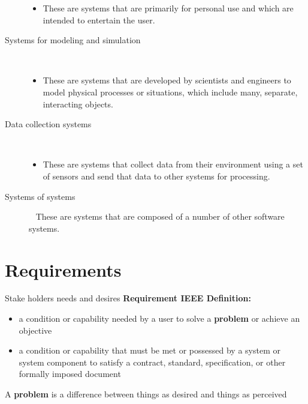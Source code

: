 \documentclass{article}
\begin{document}
\begin{description}
  \begin{itemize}
	\vspace{-8pt}
    \setlength\itemsep{-.25em}
    \item These are systems that are primarily for personal use and which
are intended to entertain the user.
  \end{itemize}
  \item [Systems for modeling and simulation] \
  \begin{itemize}
	\vspace{-8pt}
    \setlength\itemsep{-.25em}
    \item These are systems that are developed by scientists and engineers
to model physical processes or situations, which include many,
separate, interacting objects.
  \end{itemize}
  \item [Data collection systems] \
  \begin{itemize}
	\vspace{-8pt}
    \setlength\itemsep{-.25em}
    \item These are systems that collect data from their environment using a
set of sensors and send that data to other systems for processing.
  \end{itemize}
  \item [Systems of systems] \ \newline
These are systems that are composed of a number of other software systems.
\end{description}

\newpage
\section{Requirements}
\vspace{-8pt}
Stake holders needs and desires\newline
\textbf{Requirement IEEE Definition:}
  \begin{itemize}
	\vspace{-6pt}
    \setlength\itemsep{-.25em}
    \item a condition or capability needed by a user to solve a \textbf{problem} or achieve an objective
    \item a condition or capability that must be met or possessed by a system or system component to satisfy a contract, standard, specification, or other formally imposed document
  \end{itemize}
\vspace{-6pt}
A \textbf{problem} is a difference between things as desired and things as perceived
\end{document}
